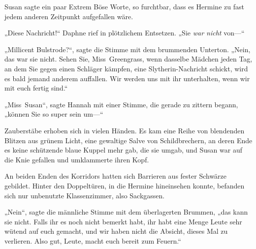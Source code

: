 Susan sagte ein paar Extrem Böse Worte, so furchtbar, dass es Hermine zu fast jedem anderen Zeitpunkt aufgefallen wäre.

„Diese Nachricht!“ Daphne rief in plötzlichem Entsetzen. „Sie \emph{war nicht} von—“

„Millicent Bulstrode?“, sagte die Stimme mit dem brummenden Unterton. „Nein, das war sie nicht. Sehen Sie, Miss~Greengrass, wenn dasselbe Mädchen jeden Tag, an dem Sie gegen einen Schläger kämpfen, eine Slytherin-Nachricht schickt, wird es bald jemand anderem auffallen. Wir werden uns mit ihr unterhalten, wenn wir mit euch fertig sind.“

„Miss~Susan“, sagte Hannah mit einer Stimme, die gerade zu zittern begann, „können Sie so super sein um—“

Zauberstäbe erhoben sich in vielen Händen. Es kam eine Reihe von blendenden Blitzen aus grünem Licht, eine gewaltige Salve von Schildbrechern, an deren Ende es keine schützende blaue Kuppel mehr gab, die sie umgab, und Susan war auf die Knie gefallen und umklammerte ihren Kopf.

An beiden Enden des Korridors hatten sich Barrieren aus fester Schwärze gebildet. Hinter den Doppeltüren, in die Hermine hineinsehen konnte, befanden sich nur unbenutzte Klassenzimmer, also Sackgassen.

„Nein“, sagte die männliche Stimme mit dem überlagerten Brummen, „das kann sie nicht. Falls ihr es noch nicht bemerkt habt, ihr habt eine Menge Leute sehr wütend auf euch gemacht, und wir haben nicht die Absicht, dieses Mal zu verlieren. Also gut, Leute, macht euch bereit zum Feuern.“

